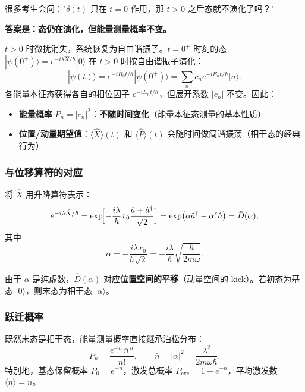 \begin{warnbox}
很多考生会问："$\delta(t)$ 只在 $t=0$ 作用，那 $t>0$ 之后态就不演化了吗？"

\textbf{答案是：态仍在演化，但能量测量概率不变。}

$t>0$ 时微扰消失，系统恢复为自由谐振子。$t=0^+$ 时刻的态 $|\psi(0^+)\rangle = e^{-i\lambda\hat{X}/\hbar}|0\rangle$ 在 $t>0$ 时按自由谐振子演化：
\[
|\psi(t)\rangle = e^{-i\hat{H}_0 t/\hbar}|\psi(0^+)\rangle
= \sum_n c_n e^{-iE_n t/\hbar}|n\rangle.
\]
各能量本征态获得各自的相位因子 $e^{-iE_n t/\hbar}$，但展开系数 $|c_n|$ 不变。因此：
\begin{itemize}[nosep]
    \item \textbf{能量概率} $P_n = |c_n|^2$：\textbf{不随时间变化}（能量本征态测量的基本性质）
    \item \textbf{位置/动量期望值}：$\langle\hat{X}\rangle(t)$ 和 $\langle\hat{P}\rangle(t)$ 会随时间做简谐振荡（相干态的经典行为）
\end{itemize}
\end{warnbox}

\subsubsection{与位移算符的对应}

将 $\hat{X}$ 用升降算符表示：
\[
e^{-i\lambda\hat{X}/\hbar}
= \exp\!\Bigl[-\frac{i\lambda}{\hbar}x_0\frac{\hat{a}+\hat{a}^\dagger}{\sqrt{2}}\Bigr]
= \exp(\alpha\hat{a}^\dagger - \alpha^*\hat{a})
= \hat{D}(\alpha),
\]
其中
\begin{equation}
\alpha = -\frac{i\lambda x_0}{\hbar\sqrt{2}}
= -\frac{i\lambda}{\hbar}\sqrt{\frac{\hbar}{2m\omega}}.
\end{equation}

由于 $\alpha$ 是纯虚数，$\hat{D}(\alpha)$ 对应\textbf{位置空间的平移}（动量空间的 kick）。若初态为基态 $|0\rangle$，则末态为相干态 $|\alpha\rangle$。

\subsubsection{跃迁概率}

既然末态是相干态，能量测量概率直接继承泊松分布：
\begin{equation}
\boxed{P_n = \frac{e^{-\bar{n}}\,\bar{n}^{\,n}}{n!},
\qquad \bar{n} = |\alpha|^2 = \frac{\lambda^2}{2m\omega\hbar}.}
\end{equation}
特别地，基态保留概率 $P_0 = e^{-\bar{n}}$，激发总概率 $P_\text{exc}=1-e^{-\bar{n}}$，平均激发数 $\langle n\rangle = \bar{n}$。

